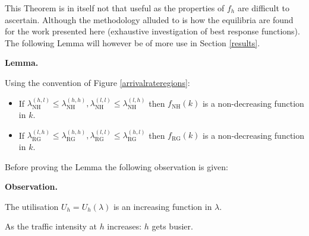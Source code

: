 \documentclass{article}
\newcommand{\NH}{\text{NH}}
\newcommand{\RG}{\text{RG}}
\begin{document}
This Theorem is in itself not that useful as the properties of $f_{h}$ are difficult to ascertain.
Although the methodology alluded to is how the equilibria are found for the work presented here (exhaustive investigation of best response functions).
The following Lemma will however be of more use in Section \ref{results}.

\textbf{Lemma.}

Using the convention of Figure \ref{arrivalrateregions}:

\begin{itemize}

\item If $\lambda_{\NH}^{(h,l)}\leq \lambda_{\NH}^{(h,h)},\lambda_{\NH}^{(l,l)}\leq \lambda_{\NH}^{(l,h)}$ then $f_{\NH}(k)$ is a non-decreasing function in $k$.
\item If $\lambda_{\RG}^{(l,h)}\leq \lambda_{\RG}^{(h,h)},\lambda_{\RG}^{(l,l)}\leq \lambda_{\RG}^{(h,l)}$ then $f_{\RG}(k)$ is a non-decreasing function in $k$.

\end{itemize}

Before proving the Lemma the following observation is given:

\textbf{Observation.}

The utilisation $U_h=U_h(\lambda)$ is an increasing function in $\lambda$.

\begin{center}
As the traffic intensity at $h$ increases: $h$ gets busier.
\end{center}
\end{document}
